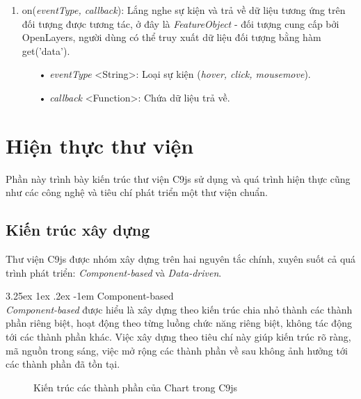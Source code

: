 \documentclass[12pt,a4paper,twoside]{article}
\makeatletter
\newcommand{\myparagraph}[1]{\paragraph{#1}\mbox{}\\} %
\renewcommand\paragraph{\@startsection{paragraph}{5}{\z@}%
  {3.25ex \@plus1ex \@minus.2ex}%
  {-1em}%
  {\normalfont\normalsize\bfseries}}
\makeatother
\begin{document}
\begin{enumerate}
\item \textsf{on(\textit{eventType, callback})}: Lắng nghe sự kiện và trả về dữ liệu tương ứng trên đối tượng được tương tác, ở đây là \textit{FeatureObject} - đối tượng cung cấp bởi OpenLayers, người dùng có thể truy xuất dữ liệu đối tượng bằng hàm \textsf{get('data')}.
	\begin{itemize}
		\item[•] \textit{eventType} <String>: Loại sự kiện (\textit{hover, click, mousemove}).
		\item[•] \textit{callback} <Function>: Chứa dữ liệu trả về.
	\end{itemize}
\end{enumerate}

\clearpage
\section{Hiện thực thư viện}
Phần này trình bày kiến trúc thư viện C9js sử dụng và quá trình hiện thực cũng như các công nghệ và tiêu chí phát triển một thư viện chuẩn.
\subsection{Kiến trúc xây dựng}\label{sec:kientruc}
Thư viện C9js được nhóm xây dựng trên hai nguyên tắc chính, xuyên suốt cả quá trình phát triển: \textit{Component-based} và \textit{Data-driven}.

\myparagraph{Component-based} 
\textit{Component-based}\cite{component_based} được hiểu là xây dựng theo kiến trúc chia nhỏ thành các thành phần riêng biệt, hoạt động theo từng luồng chức năng riêng biệt, không tác động tới các thành phần khác. Việc xây dựng theo tiêu chí này giúp kiến trúc rõ ràng, mã nguồn trong sáng, việc mở rộng các thành phần về sau không ảnh hưởng tới các thành phần đã tồn tại.

\begin{figure}[!h]
	\begin{center}
    \caption{Kiến trúc các thành phần của Chart trong C9js}
    \label{fig:chart}
	\end{center}
\end{figure}
\end{document}
